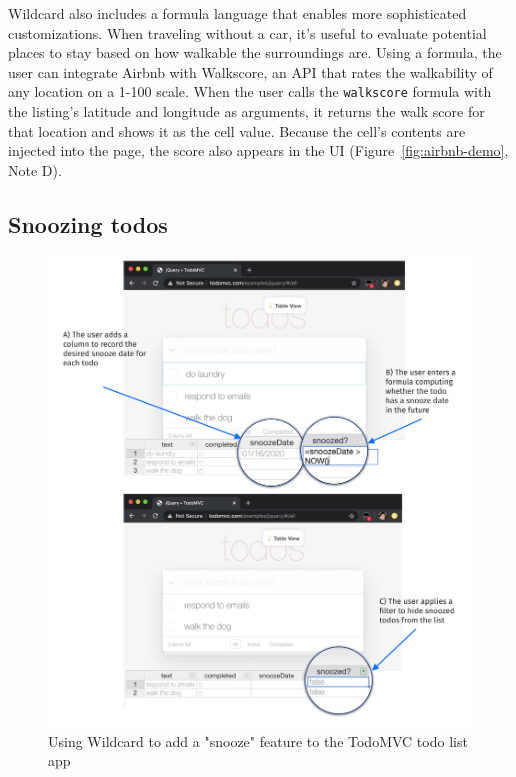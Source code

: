 \documentclass[sigplan,10pt,anonymous,review]{acmart}
\begin{document}
Wildcard also includes a formula language that enables more
sophisticated customizations. When traveling without a car, it's useful
to evaluate potential places to stay based on how walkable the
surroundings are. Using a formula, the user can integrate Airbnb with
Walkscore, an API that rates the walkability of any location on a 1-100
scale. When the user calls the \texttt{walkscore} formula with the
listing's latitude and longitude as arguments, it returns the walk score
for that location and shows it as the cell value. Because the cell's
contents are injected into the page, the score also appears in the UI{
(Figure~\ref{fig:airbnb-demo}, Note D)}.

\hypertarget{snoozing-todos}{%
\subsection{Snoozing todos}\label{snoozing-todos}}

\begin{figure}
\hypertarget{fig:airbnb-demo}{%
\centering
\includegraphics{media/todomvc-demo-300dpi.png}
\caption{Using Wildcard to add a "snooze" feature to the TodoMVC todo list app}\label{fig:todomvc-demo}
}
\end{figure}
\end{document}
